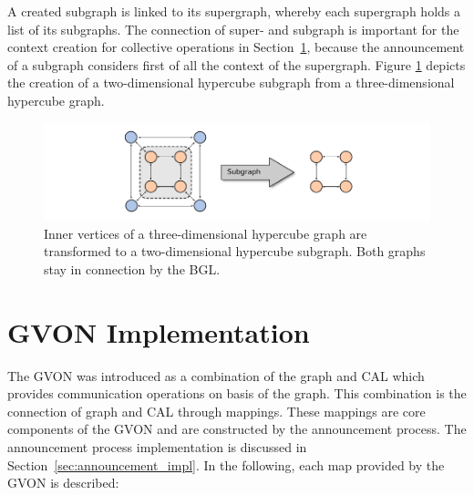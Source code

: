 \noindent A created subgraph is linked to its supergraph, whereby each
supergraph holds a list of its subgraphs. The connection of super- and
subgraph is important for the context creation for collective
operations in Section~\ref{sec:gvon_impl}, because the announcement of
a subgraph considers first of all the context of the
supergraph. Figure \ref{fig:subgraph_creation} depicts the creation of
a two-dimensional hypercube subgraph from a three-dimensional
hypercube graph.

\begin{figure}[H]
  \centering
  \includegraphics[width=\textwidth]{graphics/40_subgraph_creation}
  \caption{Inner vertices of a three-dimensional hypercube graph are 
  transformed to a two-dimensional hypercube subgraph. Both graphs
  stay in connection by the BGL.}
  \label{fig:subgraph_creation}
\end{figure}

\section{GVON Implementation}
\label{sec:gvon_impl}
The GVON was introduced as a combination of the graph and CAL which
provides communication operations on basis of the graph. This
combination is the connection of graph and CAL through mappings. These
mappings are core components of the GVON and are constructed by the
announcement process. The announcement process implementation is
discussed in Section~\ref{sec:announcement_impl}. In the following,
each map provided by the GVON is described:

